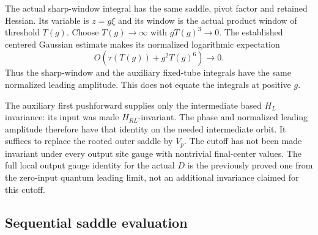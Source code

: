 \documentclass[11pt]{article}
\theoremstyle{remark}
\begin{document}
The actual sharp-window integral has the same saddle,
pivot factor and retained Hessian. Its variable is $z=g\xi$
and its window is the actual product window of threshold
$T(g)$. Choose $T(g)\to\infty$ with $gT(g)^3\to0$.
The established centered Gaussian estimate makes its
normalized logarithmic expectation
\begin{equation}
                          O\!\left(\tau(T(g))+g^2T(g)^6\right)
                              \longrightarrow0.
 \label{olc-sharp-leading}
\end{equation}
Thus the sharp-window and the auxiliary fixed-tube integrals
have the same normalized leading amplitude. This does not
equate the integrals at positive $g$.

The auxiliary first pushforward supplies only the intermediate
based $H_L$ invariance: its input was made $H_{RL}$-invariant.
The phase and normalized leading amplitude therefore have
that identity on the needed intermediate orbit. It suffices
to replace the rooted outer saddle by $V_p$.
The cutoff has not been made invariant under every output
site gauge with nontrivial final-center values. The full
local output gauge identity for the actual $D$ is the
previously proved one from the zero-input quantum leading
limit, not an additional invariance claimed for this cutoff.

\subsection{Sequential saddle evaluation}
\label{olc-proof-section}
\end{document}
